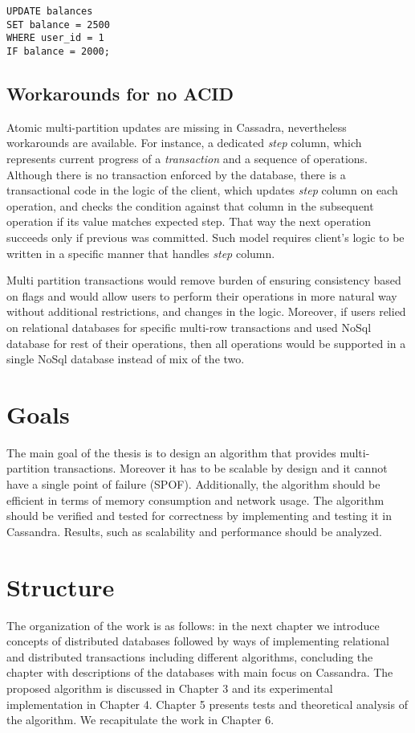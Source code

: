 \begin{example}
\label{lst:intro:lwtUpdate}
\begin{lstlisting}[style=outcode,caption={LWT Update with column condition}]
UPDATE balances 
SET balance = 2500 
WHERE user_id = 1
IF balance = 2000;
\end{lstlisting}
\end{example}


\subsection{Workarounds for no ACID}
Atomic multi-partition updates are missing in Cassadra, nevertheless workarounds are available. For instance, a dedicated \emph{step} column, which represents current progress of a \emph{transaction} and a sequence of \lwt operations. Although there is no transaction enforced by the database, there is a transactional code in the logic of the client, which updates \emph{step} column on each operation, and checks the condition against that column in the subsequent operation if its value matches expected step. That way the next operation succeeds only if previous was committed. 
Such model requires client's logic to be written in a specific manner that handles \emph{step} column. 

Multi partition transactions would remove burden of ensuring consistency based on flags and would allow users to perform their operations in more natural way without additional restrictions, and changes in the logic. Moreover, if users relied on relational databases for specific multi-row transactions and used NoSql database for rest of their operations, then all operations would be supported in a single NoSql database instead of mix of the two.

\section{Goals}
The main goal of the thesis is to design an algorithm that provides multi-partition transactions. Moreover it has to be scalable by design and it cannot have a single point of failure (SPOF). Additionally, the algorithm should be efficient in terms of memory consumption and network usage. The algorithm should be verified and tested for correctness by implementing and testing it in Cassandra. Results, such as scalability and performance should be analyzed.

 
\section{Structure}\label{sec:introduction:structure}
The organization of the work is as follows: 
in the next chapter we introduce concepts of distributed databases followed by ways of implementing relational and distributed transactions including different algorithms, concluding the chapter with descriptions of the databases with main focus on Cassandra. 
The proposed algorithm is discussed in Chapter 3 and its experimental implementation in Chapter 4.
Chapter 5 presents tests and theoretical analysis of the algorithm.
We recapitulate the work in Chapter 6.


